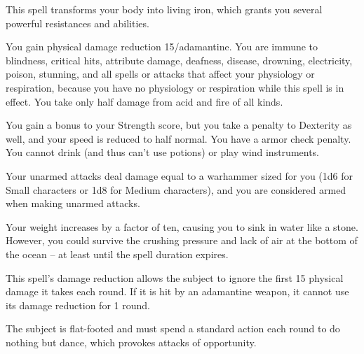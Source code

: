 \spellrng{\rngpers}
\begin{spelleffect}
  This spell transforms your body into living iron, which grants you several powerful resistances and abilities.
  \par You gain physical damage reduction 15/adamantine. You are immune to blindness, critical hits, attribute damage, deafness, disease, drowning, electricity, poison, stunning, and all spells or attacks that affect your physiology or respiration, because you have no physiology or respiration while this spell is in effect. You take only half damage from acid and fire of all kinds.
  \par You gain a  bonus to your Strength score, but you take a  penalty to Dexterity as well, and your speed is reduced to half normal. You have a  armor check penalty. You cannot drink (and thus can't use potions) or play wind instruments.
  \par Your unarmed attacks deal damage equal to a warhammer sized for you (1d6 for Small characters or 1d8 for Medium characters), and you are considered armed when making unarmed attacks.
  \par Your weight increases by a factor of ten, causing you to sink in water like a stone. However, you could survive the crushing pressure and lack of air at the bottom of the ocean -- at least until the spell duration expires.
\end{spelleffect}
\begin{spellnotes}
  This spell's damage reduction allows the subject to ignore the first 15 physical damage it takes each round. If it is hit by an adamantine weapon, it cannot use its damage reduction for 1 round.
\end{spellnotes}

\spellrng{\rngclose}
\begin{spelleffect}
  The subject is flat-footed and must spend a standard action each round to do nothing but dance, which provokes attacks of opportunity.
\end{spelleffect}

